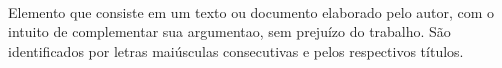 \paragraph{}Elemento que consiste em um texto ou documento elaborado pelo autor, com o intuito de complementar sua argumentao, sem prejuízo do trabalho. São identificados por letras maiúsculas consecutivas e pelos respectivos títulos.